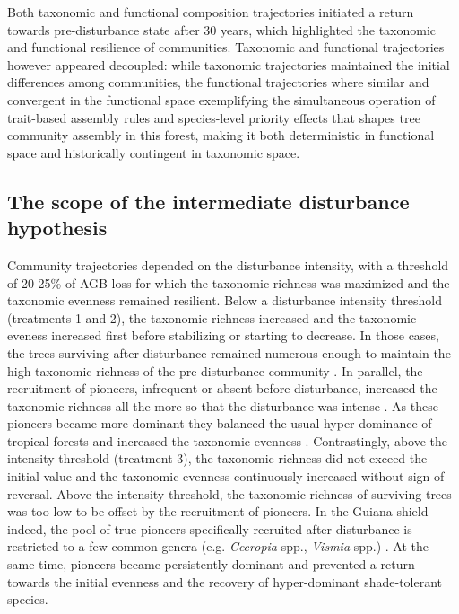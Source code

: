 \documentclass[fleqn,10pt]{ArtEcoFoG} %
\begin{document}
Both taxonomic and functional composition trajectories initiated a
return towards pre-disturbance state after 30 years, which highlighted
the taxonomic and functional resilience of communities. Taxonomic and
functional trajectories however appeared decoupled: while taxonomic
trajectories maintained the initial differences among communities, the
functional trajectories where similar and convergent in the functional
space \citep{Fukami2005} exemplifying the simultaneous operation of
trait-based assembly rules and species-level priority effects that
shapes tree community assembly in this forest, making it both
deterministic in functional space and historically contingent in
taxonomic space.

\subsection{The scope of the intermediate disturbance
hypothesis}\label{the-scope-of-the-intermediate-disturbance-hypothesis}

Community trajectories depended on the disturbance intensity, with a
threshold of 20-25\% of AGB loss for which the taxonomic richness was
maximized and the taxonomic evenness remained resilient. Below a
disturbance intensity threshold (treatments 1 and 2), the taxonomic
richness increased and the taxonomic eveness increased first before
stabilizing or starting to decrease. In those cases, the trees surviving
after disturbance remained numerous enough to maintain the high
taxonomic richness of the pre-disturbance community \citep{Bongers2009}.
In parallel, the recruitment of pioneers, infrequent or absent before
disturbance, increased the taxonomic richness all the more so that the
disturbance was intense \citep{Martin2015, Chaudhary2016}. As these
pioneers became more dominant they balanced the usual hyper-dominance of
tropical forests and increased the taxonomic evenness
\citep{Baraloto2012a}. Contrastingly, above the intensity threshold
(treatment 3), the taxonomic richness did not exceed the initial value
and the taxonomic evenness continuously increased without sign of
reversal. Above the intensity threshold, the taxonomic richness of
surviving trees was too low to be offset by the recruitment of pioneers.
In the Guiana shield indeed, the pool of true pioneers specifically
recruited after disturbance is restricted to a few common genera (e.g.
\emph{Cecropia} spp., \emph{Vismia} spp.) \citep{Guitet2018}. At the
same time, pioneers became persistently dominant and prevented a return
towards the initial evenness and the recovery of hyper-dominant
shade-tolerant species.
\end{document}
